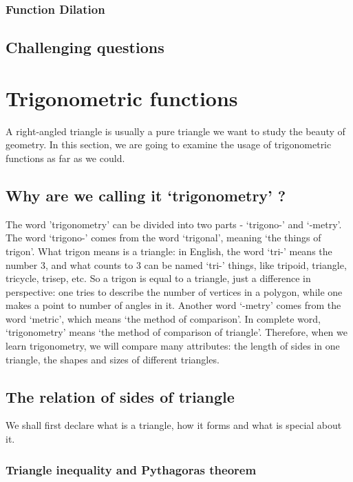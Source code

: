 \documentclass[12pt]{article}
\begin{document}
    \subsubsection*{Function Dilation}

    \subsection{Challenging questions}

    \newpage

    \section{Trigonometric functions}

    A right-angled triangle is usually a pure triangle we want to study the beauty of geometry. In this section, we are going to examine the usage of trigonometric functions as far as we could.

    \subsection{Why are we calling it `trigonometry' ?}

    The word 'trigonometry' can be divided into two parts - `trigono-' and `-metry'. The word `trigono-' comes from the word `trigonal', meaning `the things of trigon'. What trigon means is a triangle: in English, the word `tri-' means the number 3, and what counts to 3 can be named `tri-' things, like tripoid, triangle, tricycle, trisep, etc. So a trigon is equal to a triangle, just a difference in perspective: one tries to describe the number of vertices in a polygon, while one makes a point to number of angles in it. Another word `-metry' comes from the word `metric', which means `the method of comparison'. In complete word, `trigonometry' means `the method of comparison of triangle'. Therefore, when we learn trigonometry, we will compare many attributes: the length of sides in one triangle, the shapes and sizes of different triangles.

    \subsection{The relation of sides of triangle}

    We shall first declare what is a triangle, how it forms and what is special about it.

    \subsubsection*{Triangle inequality and Pythagoras theorem}
\end{document}
